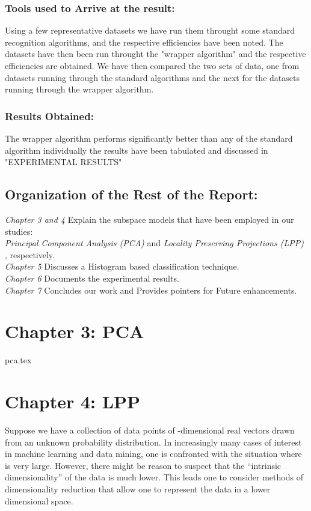 \documentclass[12pt,a4paper]{book}
\begin{document}
		\subsubsection{Tools used to Arrive at the result:}
			Using a few representative datasets we have run them throught some 				standard recognition algorithms, and the respective efficiencies have been 			noted. The datasets have then been run throught the "wrapper algorithm" 				and the respective efficiencies are obtained. 
				We have then compared the two sets of data, one from datasets 				running through the standard algorithms and the next for the datasets 				running through the wrapper algorithm.

		\subsubsection{Results Obtained:}
			The wrapper algorithm performs significantly better than any of the 					standard algorithm individually
			the results have been tabulated and discussed in "EXPERIMENTAL 				RESULTS"

	\subsection{Organization of the Rest of the Report:}
		\emph{Chapter 3 and 4} Explain the subspace models that have been employed in our 			studies:\\ \emph{Principal Component Analysis (PCA)} and \emph{Locality Preserving Projections (LPP)} , respectively.\\
		\emph{Chapter 5} Discusses a Histogram based classification technique.\\
		\emph{Chapter 6} Documents the experimental results.\\
		\emph{Chapter 7} Concludes our work and Provides pointers for Future enhancements.\\

\section{Chapter 3: PCA}
pca.tex
\section{Chapter 4: LPP}
	Suppose we have a collection of data points of -dimensional real vectors drawn from an 		unknown probability distribution. In increasingly many cases of interest in machine 		learning and data mining, one is confronted with the situation where is very large. 			However, there might be reason to suspect that the “intrinsic dimensionality” of
	the data is much lower. This leads one to consider methods of dimensionality reduction 		that allow one to represent the data in a lower dimensional space.
	
\end{document}
